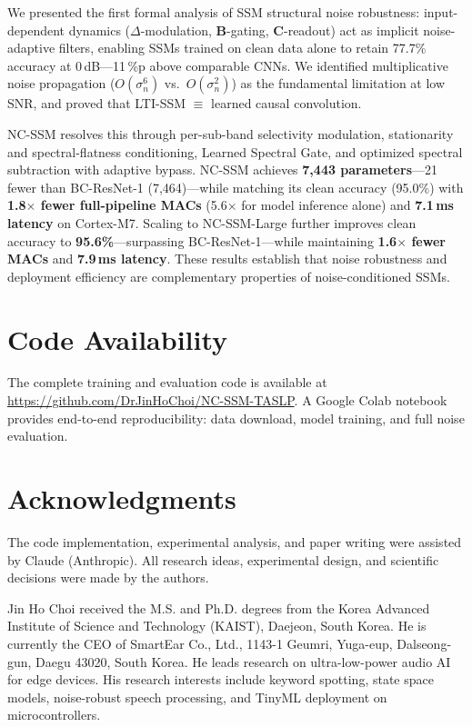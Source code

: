 \documentclass[journal]{IEEEtran}
\begin{document}
We presented the first formal analysis of SSM structural noise robustness: input-dependent dynamics ($\Delta$-modulation, $\mathbf{B}$-gating, $\mathbf{C}$-readout) act as implicit noise-adaptive filters, enabling SSMs trained on clean data alone to retain 77.7\% accuracy at 0\,dB---11\,\%p above comparable CNNs.
We identified multiplicative noise propagation ($O(\sigma_n^6)$ vs.\ $O(\sigma_n^2)$) as the fundamental limitation at low SNR, and proved that LTI-SSM $\equiv$ learned causal convolution.

NC-SSM resolves this through per-sub-band selectivity modulation, stationarity and spectral-flatness conditioning, Learned Spectral Gate, and optimized spectral subtraction with adaptive bypass.
NC-SSM achieves \textbf{7{,}443 parameters}---21 fewer than BC-ResNet-1 (7{,}464)---while matching its clean accuracy (95.0\%) with \textbf{1.8$\times$ fewer full-pipeline MACs} (5.6$\times$ for model inference alone) and \textbf{7.1\,ms latency} on Cortex-M7.
Scaling to NC-SSM-Large further improves clean accuracy to \textbf{95.6\%}---surpassing BC-ResNet-1---while maintaining \textbf{1.6$\times$ fewer MACs} and \textbf{7.9\,ms latency}.
These results establish that noise robustness and deployment efficiency are complementary properties of noise-conditioned SSMs.


\section*{Code Availability}
The complete training and evaluation code is available at \url{https://github.com/DrJinHoChoi/NC-SSM-TASLP}.
A Google Colab notebook provides end-to-end reproducibility: data download, model training, and full noise evaluation.

\section*{Acknowledgments}
The code implementation, experimental analysis, and paper writing were assisted by Claude (Anthropic).
All research ideas, experimental design, and scientific decisions were made by the authors.





\begin{IEEEbiography}[]{Jin Ho Choi}
received the M.S. and Ph.D. degrees from the Korea Advanced Institute of Science and Technology (KAIST), Daejeon, South Korea.
He is currently the CEO of SmartEar Co., Ltd., 1143-1 Geumri, Yuga-eup, Dalseong-gun, Daegu 43020, South Korea.
He leads research on ultra-low-power audio AI for edge devices.
His research interests include keyword spotting, state space models, noise-robust speech processing, and TinyML deployment on microcontrollers.
\end{IEEEbiography}
\end{document}
